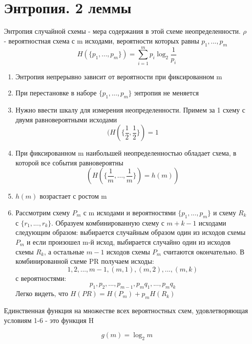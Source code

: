 \documentclass[discrete.tex]{subfiles}
\begin{document}
  \section{Энтропия. 2 леммы}

  \begin{definition}
    Энтропия случайной схемы - мера содержания в этой схеме неопределенности. $\rho$ - вероятностная схема с m исходами, вероятности которых равны $p_1,...,p_m$
    \[H(\{p_1,...,p_m\}) = \sum_{i=1}^m p_i \log_2 \frac{1}{p_i}\]
  \end{definition}

  \begin{properties}
    \begin{enumerate}
      \item Энтропия непрерывно зависит от вероятности при фиксированном m
      \item При перестановке в наборе $\{ p_1,...,p_m\}$ энтропия не меняется
      \item Нужно ввести шкалу для измерения неопределенности. Примем за 1 схему с двумя равновероятными исходами
      \[(H(\{\frac{1}{2},\frac{1}{2}\}) = 1\]
      \item При фиксированном m наибольшей неопределенностью обладает схема, в которой все события равновероятны
      \[(H(\{\frac{1}{m},...,\frac{1}{m}\}) = h(m))\]
      \item $h(m)$ возрастает с ростом m
      \item Рассмотрим схему $P_m$ с m исходами и вероятностями $\{p_1,...,p_m\}$ и схему $R_k$ с $\{r_1,...,r_k\}$. Образуем комбинированную схему с $m+k-1$ исходами следующим образом: выбирается случайным образом один из исходов схемы $P_m$ и если произошел m-й исход, выбирается случайно один из исходов схемы $R_k$, а остальные $m-1$ исходов схемы $P_m$ считаются окончательно. В комбинированной схеме PR получаем исходы:
      \[1,2,...,m-1,(m,1),(m,2),...,(m,k)\]
      с вероятностями:
      \[p_1,p_2,...,p_{m-1},p_m q_1,...,p_m q_k\]
      Легко видеть, что $H(PR)=H(P_m)+p_m H(R_k)$
    \end{enumerate}
  \end{properties}

  \begin{theorem}
    Единственная функция на множестве всех вероятностных схем, удовлетворяющая условиям 1-6 - это функция H
  \end{theorem}

  \begin{Lemma}[1]
    \[g(m) = \log_2 m\]
  \end{Lemma}
\end{document}
